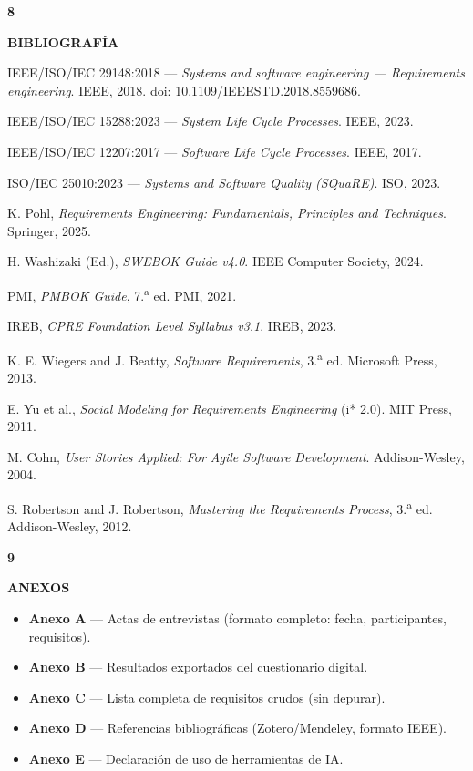 \documentclass[11pt,a4paper]{article}
\newcommand{\secband}[2]{%
  \par\vspace{9pt}\noindent
  {\setlength{\fboxsep}{0pt}%
   \colorbox{secdark}{\parbox[c][20pt][c]{0.05\textwidth}{\centering\textbf{\color{white}\small #1}}}%
   \colorbox{secblue}{\parbox[c][20pt][c]{0.95\textwidth}{\hspace{8pt}\textbf{\color{white}\small #2}}}%
  }\par\vspace{5pt}}
\begin{document}
\secband{8}{BIBLIOGRAFÍA}
\small
\begin{enumerate}[label={[\arabic*]}, leftmargin=2.6em]
\item IEEE/ISO/IEC 29148:2018 — \textit{Systems and software engineering — Requirements engineering}. IEEE, 2018. doi: 10.1109/IEEESTD.2018.8559686.
\item IEEE/ISO/IEC 15288:2023 — \textit{System Life Cycle Processes}. IEEE, 2023.
\item IEEE/ISO/IEC 12207:2017 — \textit{Software Life Cycle Processes}. IEEE, 2017.
\item ISO/IEC 25010:2023 — \textit{Systems and Software Quality (SQuaRE)}. ISO, 2023.
\item K. Pohl, \textit{Requirements Engineering: Fundamentals, Principles and Techniques}. Springer, 2025.
\item H. Washizaki (Ed.), \textit{SWEBOK Guide v4.0}. IEEE Computer Society, 2024.
\item PMI, \textit{PMBOK Guide}, 7.\textsuperscript{a} ed. PMI, 2021.
\item IREB, \textit{CPRE Foundation Level Syllabus v3.1}. IREB, 2023.
\item K. E. Wiegers and J. Beatty, \textit{Software Requirements}, 3.\textsuperscript{a} ed. Microsoft Press, 2013.
\item E. Yu et al., \textit{Social Modeling for Requirements Engineering} (i* 2.0). MIT Press, 2011.
\item M. Cohn, \textit{User Stories Applied: For Agile Software Development}. Addison-Wesley, 2004.
\item S. Robertson and J. Robertson, \textit{Mastering the Requirements Process}, 3.\textsuperscript{a} ed. Addison-Wesley, 2012.
\end{enumerate}

\secband{9}{ANEXOS}
\begin{itemize}
\item \textbf{Anexo A} — Actas de entrevistas (formato completo: fecha, participantes, requisitos).
\item \textbf{Anexo B} — Resultados exportados del cuestionario digital.
\item \textbf{Anexo C} — Lista completa de requisitos crudos (sin depurar).
\item \textbf{Anexo D} — Referencias bibliográficas (Zotero/Mendeley, formato IEEE).
\item \textbf{Anexo E} — Declaración de uso de herramientas de IA.
\end{itemize}
\end{document}
